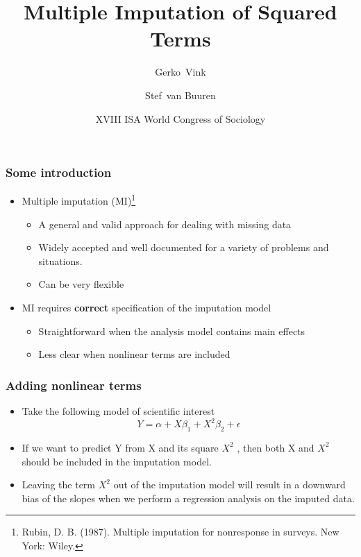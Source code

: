 \documentclass{beamer}
\title[Imputing squares] {Multiple Imputation of Squared Terms}
\author[Vink, Van Buuren]
{
  Gerko~Vink \and
  Stef~van Buuren
}
\date[ISA 2014]
{XVIII ISA World Congress of Sociology \vskip6mm}
\begin{document}
\titlepage
{}


\begin{frame}
  \frametitle{Some introduction}
  
  \begin{itemize}
  \item Multiple imputation (MI)\footnote{\tiny{Rubin, D. B. (1987). Multiple imputation for nonresponse in surveys. New York: Wiley.}}
 	  \begin{itemize}
	  \item A general and valid approach for dealing with missing data
	  \item Widely accepted and well documented for a variety of problems and situations. 
	  \item Can be very flexible
	  \end{itemize} \vspace{.25 in}
  \item MI requires {\bf correct} specification of the imputation model	  
   	  \begin{itemize}
	  \item Straightforward when the analysis model contains main effects
	  \item Less clear when nonlinear terms are included
	  \end{itemize}
  \end{itemize}
 \end{frame}
 
\begin{frame}
  \frametitle{Adding nonlinear terms}
  \begin{itemize}
  \item Take the following model of scientific interest
\begin{equation*}\label{Y}
Y = \alpha + X \beta_1 + X^2 \beta_2 + \epsilon
\end{equation*}
\item If we want to predict Y from X and its square $X^2$ , then both X and $X^2$ should be included in the imputation model. 
\item Leaving the term $X^2$ out of the imputation model will result in a downward bias of the slopes when we perform a regression analysis on the imputed data.
  \end{itemize}
 \end{frame}
 
\end{document}
